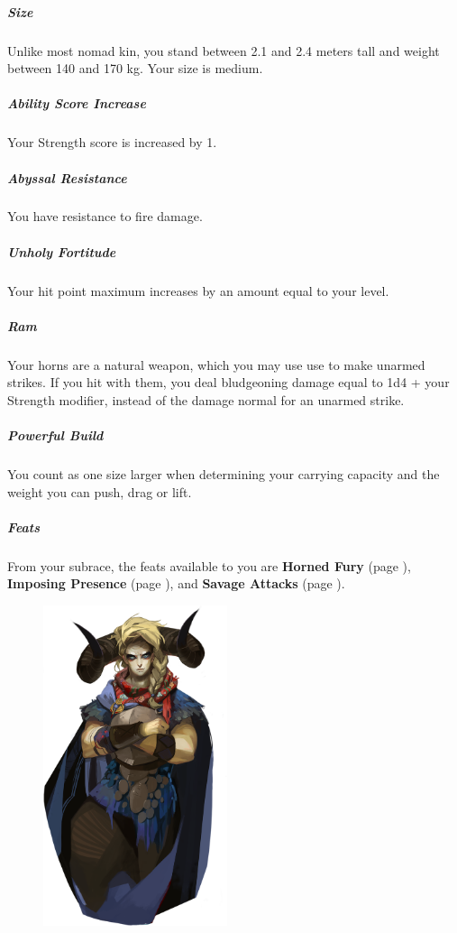     \subparagraph{Size} Unlike most nomad kin, you stand between 2.1 and 2.4 meters tall and weight between 140 and 170 kg.
    Your size is medium.

    \subparagraph{Ability Score Increase} Your Strength score is increased by 1.


    \subparagraph{Abyssal Resistance} You have resistance to fire damage.

    \subparagraph{Unholy Fortitude} Your hit point maximum increases by an amount equal to your level.

    \subparagraph{Ram} Your horns are a natural weapon, which you may use use to make unarmed strikes.
    If you hit with them, you deal bludgeoning damage equal to 1d4 + your Strength modifier, instead of the damage normal for an unarmed strike.

    \subparagraph{Powerful Build} You count as one size larger when determining your carrying capacity and the weight you can push, drag or lift.

    \subparagraph{Feats} From your subrace, the feats available to you are
    \textbf{Horned Fury} (page \pageref{feat::hornedfury}),
    \textbf{Imposing Presence} (page \pageref{feat::imposingpresence}), and
    \textbf{Savage Attacks} (page \pageref{feat::savageattacks}).

\begin{figure}[!b]
    \centering
    \includegraphics[width=0.48\textwidth]{04kins/img/19uman_cursed.png}
\end{figure}
